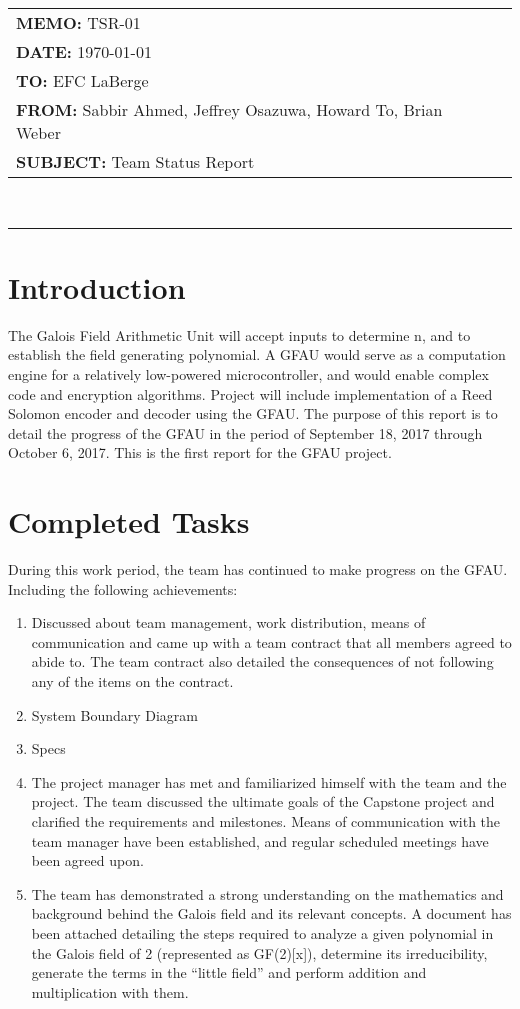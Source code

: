 \documentclass[paper=usletter, fontsize=12pt]{article}
\newcommand{\Sabbir}{Sabbir Ahmed}
\newcommand{\Jeffrey}{Jeffrey Osazuwa}
\newcommand{\Howard}{Howard To}
\newcommand{\Brian}{Brian Weber}
\newcommand{\documentinfo}[5]{
    \begin{centering}
        \parbox{6.8in}{
        \begin{spacing}{1}
            \begin{flushleft}
                \begin{tabular}{l l}
                    #1 \\
                    #2 \\
                    #3 \\
                    #4 \\
                    #5 \\
                \end{tabular}\\
                \rule{\textwidth}{1pt}
            \end{flushleft}
        \end{spacing}
        }
    \end{centering}
}
\begin{document}
    \documentinfo{\textbf{MEMO:} TSR-01}{\textbf{DATE: }{\today}}{\textbf{TO: } EFC LaBerge}{\textbf{FROM: }\Sabbir, \Jeffrey, \Howard, \Brian}{\textbf{SUBJECT: } Team Status Report}

    \vspace{-0.3in}
    \section{Introduction}
    The Galois Field Arithmetic Unit will accept inputs to determine n, and to establish the field generating polynomial. A GFAU would serve as a computation engine for a relatively low-powered microcontroller, and would enable complex code and encryption algorithms. Project will include implementation of a Reed Solomon encoder and decoder using the GFAU. The purpose of this report is to detail the progress of the GFAU in the period of September 18, 2017 through October 6, 2017. This is the first report for the GFAU project. 


    \section{Completed Tasks}
    During this work period, the team has continued to make progress on the GFAU. Including the following achievements:
    \begin{enumerate}[label=\alph*)]

        \item Discussed about team management, work distribution, means of communication and came up with a team contract that all members agreed to abide to. The team contract also detailed the consequences of not following any of the items on the contract.

        \item System Boundary Diagram 

        \item Specs

        \item The project manager has met and familiarized himself with the team and the project. The team discussed the ultimate goals of the Capstone project and clarified the requirements and milestones. Means of communication with the team manager have been established, and regular scheduled meetings have been agreed upon.

        \item The team has demonstrated a strong understanding on the mathematics and background behind the Galois field and its relevant concepts. A document has been attached detailing the steps required to analyze a given polynomial in the Galois field of 2 (represented as GF(2)[x]), determine its irreducibility, generate the terms in the “little field” and perform addition and multiplication with them.

    \end{enumerate}
\end{document}
